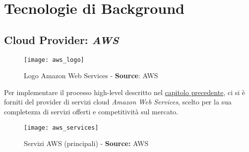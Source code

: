 \documentclass[../main.tex]{subfiles}
\begin{document}
    \chapter{Tecnologie di Background}
	
    	\section{Cloud Provider: \emph{AWS}}
    	
    	    \begin{figure}[h]
    			\centering
    			\texttt{[image: aws\_logo]}
    			\caption{Logo Amazon Web Services - \textbf{Source}: AWS}
    			\label{fig:aws_logo}
    	    \end{figure}
    	
    	    Per implementare il processo high-level descritto nel \hyperref[sec:devops_process]{capitolo precedente}, ci si è forniti del provider di servizi cloud \emph{Amazon Web Services}, scelto per la sua completezza di servizi offerti e competitività sul mercato.
    	    
    	    \begin{figure}[H]
    			\centering
    			\texttt{[image: aws\_services]}
    			\caption{Servizi AWS (principali) - \textbf{Source:} AWS}
    			\label{fig:aws_services}
    	    \end{figure}
    	    
\end{document}
